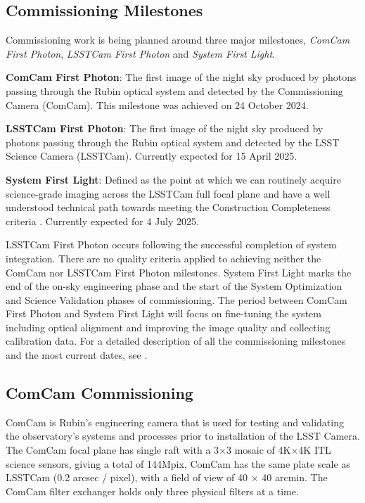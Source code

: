 \subsection{Commissioning Milestones}
\label{ssec:commissioning-milestones}

Commissioning work is being planned around three major milestones, \textit{ComCam First Photon}, \textit{LSSTCam First Photon} and \textit{System First Light}. 

\textbf{ComCam First Photon}: The first image of the night sky produced by photons passing through the Rubin optical system and detected by the Commissioning Camera (ComCam). 
This milestone was achieved on 24 October 2024. 

\textbf {LSSTCam First Photon}: The first image of the night sky produced by photons passing through the Rubin optical system and detected by the LSST Science Camera (LSSTCam).
Currently expected  for 15 April 2025.

\textbf {System First Light}: Defined as the point at which we can routinely acquire science-grade imaging across the LSSTCam full focal plane and have a well understood technical path towards meeting the Construction Completeness criteria   .
Currently expected for 4 July 2025. 

LSSTCam First Photon occurs following the successful completion of system integration. 
There are no quality criteria applied to achieving  neither the ComCam nor LSSTCam First Photon milestones. 
System First Light  marks the end of the  on-sky engineering phase and the start of the System Optimization and Science Validation phases of commissioning.
The period between ComCam First Photon and System First Light will focus on fine-tuning the system including optical alignment and improving the image quality and collecting calibration data.
For a detailed description of all the commissioning milestones and the most current dates, see .

\subsection{ComCam Commissioning}
\label{ssec:commissioning-comcam}

ComCam is Rubin's engineering camera that is used for testing and validating the observatory's systems and processes prior to installation of the LSST Camera.
The ComCam focal plane has single raft with a 3×3 mosaic of 4K×4K ITL science sensors, giving a total of 144Mpix, 
ComCam has the same plate scale as LSSTCam (0.2 arcsec / pixel), with a field of view of 40 × 40 arcmin.
The ComCam filter exchanger holds only three physical filters at a time.

